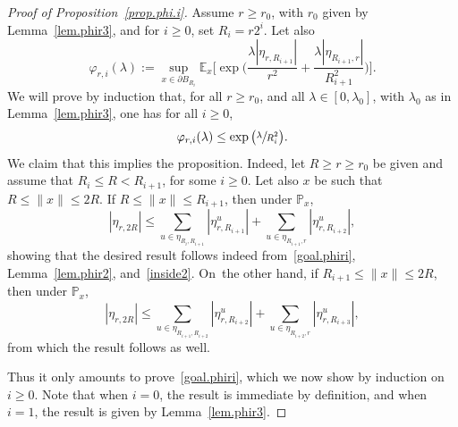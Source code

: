 \documentclass[JEP,XML,SOM,Unicode,NoFloatCountersInSection,published]{cedram}
\theoremstyle{plain}
\theoremstyle{definition}
\newcommand{\1}{{\text{\Large $\mathfrak 1$}}}
\let\phi\varphi
\begin{document}
\begin{proof}[Proof of Proposition~\ref{prop.phi.i}]
Assume $r\ge r_0$, with $r_0$ given by Lemma~\ref{lem.phir3}, and for $i\ge 0$, set $R_i = r2^i$. Let also
\[
\phi_{r,i}(\lambda) := \sup_{x\in \partial B_{R_i}}
\mathbb E_x\Big[\exp\Big(\frac{\lambda|\eta_{r,R_{i+1}}|}{r^2}
+ \frac{\lambda|\eta_{R_{i+1},r}|}{R_{i+1}^2}\Big)\Big].
\]
We will prove by induction that,
for all $r\ge r_0$, and all $\lambda\in[0,\lambda_0]$, with $\lambda_0$ as in Lemma~\ref{lem.phir3}, one has for all $i\ge 0$,
\begin{equation}\label{goal.phiri}
\varphi_{r,i}(\lambda)\le \exp\big(\sfrac{\lambda}{R_i^2}\big).
\end{equation}
We claim that this implies the proposition.
Indeed, let $R\ge r\ge r_0$ be given and assume that $R_i\le R< R_{i+1}$, for some $i\ge 0$. Let also $x$ be such that $R\le \|x\|\le 2R$.
If $R\le \|x\|\le R_{i+1}$, then under $\mathbb P_x$,
\[
|\eta_{r,2R}|\le \sum_{u\in \eta_{R_i,R_{i+1}}} |\eta^u_{r,R_{i+1}}|
+ \sum_{u\in \eta_{R_{i+1},r}} |\eta^u_{r,R_{i+2}}|,
\]
showing that the desired result follows indeed from~\eqref{goal.phiri},
Lemma~\ref{lem.phir2}, and~\eqref{inside2}.
On~the other hand, if $R_{i+1}\le \|x\|\le 2R$, then under $\mathbb P_x$,
\[
|\eta_{r,2R}|\le \sum_{u\in \eta_{R_{i+1},R_{i+2}} }
|\eta^u_{r,R_{i+2}}| + \sum_{u\in \eta_{R_{i+2},r} }
|\eta^u_{r,R_{i+3}}|,
\]
from which the result follows as well.

Thus it only amounts to prove~\eqref{goal.phiri},
which we now show by induction on $i\ge 0$.
Note that when $i=0$, the result is immediate by definition, and when $i=1$, the result is given by Lemma~\ref{lem.phir3}.


\end{proof}
\end{document}
